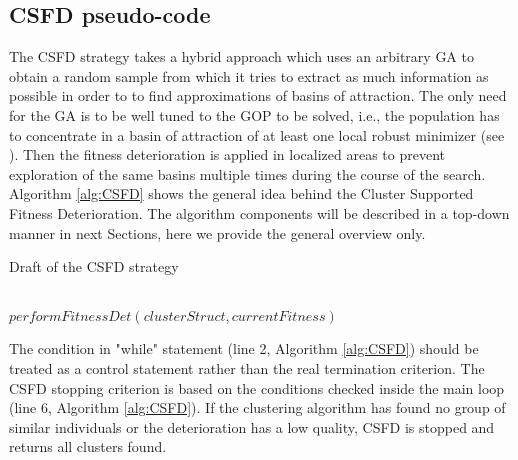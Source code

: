 \subsection{CSFD pseudo-code}
\label{sec:CSFDalgorithm}


The CSFD strategy takes a hybrid approach which uses an arbitrary 
GA to obtain a random sample from which it tries 
to extract as much information as possible in order to to find 
approximations of basins of attraction. 
The only need for the GA is to be well tuned to the GOP to be solved,
i.e., the population has to concentrate in a basin of attraction
of at least one local robust minimizer (see \cite{Schaefer2007}).
Then the fitness deterioration is applied in localized 
areas to prevent exploration of the
same basins multiple times during the course of the search.
Algorithm \ref{alg:CSFD} shows the general idea behind the 
Cluster Supported Fitness Deterioration. 
The algorithm components will be described in a top-down
manner in next Sections, here we provide the general overview only.
 

\begin{algorithm}
\caption{Draft of the CSFD strategy}
\label{alg:CSFD}
\begin{algorithmic}[1]
		\RETURN
	\ENDIF
	\\
	$performFitnessDet(clusterStruct,currentFitness)$
		\RETURN
	\ENDIF
\ENDWHILE
\end{algorithmic}
\end{algorithm}

The condition in "while" statement (line 2, Algorithm \ref{alg:CSFD})
should be treated as a control statement rather than the real termination criterion. 
The CSFD stopping criterion is based on the conditions checked inside the main loop 
(line 6, Algorithm \ref{alg:CSFD}).
If the clustering algorithm has found no group of similar individuals 
or the deterioration has a low quality, CSFD is stopped and returns
all clusters found.

